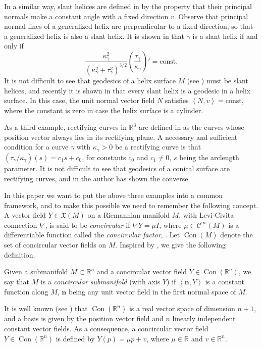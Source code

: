 \documentclass[eqnumis, pdf]{hjms}
\def\R#1{\ensuremath{\mathbb{R}^{#1}}}
\def\<{\left<}
\def\>{\right>}
\def\Xfrak{\mathfrak{X}}
\DeclareMathOperator{\Con}{Con}
\def\bfn{\mathbf{n}}
\begin{document}
In a similar way, slant helices are defined in \cite{IT1} by the property that their principal normals make a constant angle with a fixed direction $v$. Observe that principal normal lines of a generalized helix are perpendicular to a fixed direction, so that a generalized helix is also a slant helix. It is shown in \cite{IT1} that $\gamma$ is a slant helix if and only if
\[
\frac{\kappa_\gamma^2}{(\kappa_\gamma^2+\tau_\gamma^2)^{3/2}}\left(\frac{\tau_\gamma}{\kappa_\gamma}\right)'=\text{const}.
\]
It is not difficult to see that geodesics of a helix surface $M$ (see \cite{DSRH09}) must be slant helices, and recently it is shown in \cite{LO16a} that every slant helix is a geodesic in a helix surface. In this case, the unit normal vector field $N$ satisfies $\<N,v\>=\text{const}$, where the constant is zero in case the helix surface is a cylinder.

As a third example, rectifying curves in $\R3$ are defined in \cite{Chen03} as the curves whose position vector always lies in its rectifying plane. A necessary and sufficient condition for a curve $\gamma$ with $\kappa_\gamma>0$ be a rectifying curve is that $(\tau_\gamma/\kappa_\gamma)(s)=c_1s+c_0$, for constants $c_0$ and $c_1\neq0$, $s$ being the arclength parameter. It is not difficult to see that geodesics of a conical surface are rectifying curves, and in \cite{Chen17b} the author has shown the converse.

In this paper we want to put the above three examples into a common framework, and to make this possible we need to remember the following concept.
A vector field $Y\in\Xfrak(M)$ on a Riemannian manifold $M$, with Levi-Civita connection $\nabla$, is said to be \emph{concircular} if $\nabla Y=\mu I$, where $\mu\in\mathcal{C}^\infty(M)$ is a differentiable function called the \emph{concircular factor}, \cite{Fia39, Yan40, Kim82, Cram07}. Let $\Con(M)$ denote the set of concircular vector fields on $M$.
Inspired by \cite{DSRH09, Chen16}, we give the following definition.
\begin{definition}\label{concsubm}
Given a submanifold $M\subset\R{n}$ and a concircular vector field $Y\in\Con(\R{n})$, we say that $M$ is a \emph{concircular submanifold} (with axis $Y$) if $\<\bfn,Y\>$ is a constant function along $M$, $\bfn$ being any unit vector field in the first normal space of $M$.
\end{definition}

It is well known (see \cite{Cram07}) that $\Con(\R{n})$ is a real vector space of dimension $n+1$, and a basis is given by the position vector field and $n$ linearly independent constant vector fields. As a consequence, a concircular vector field $Y\in\Con(\R{n})$ is defined by $Y(p)=\mu p+v$, where $\mu\in\R{}$ and $v\in\R{n}$.
\end{document}
